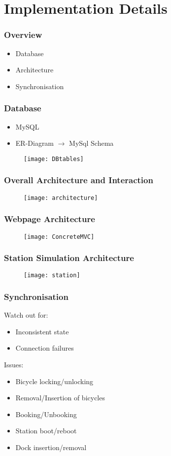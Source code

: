 \section{Implementation Details}

\begin{frame}
\frametitle{Overview}
\begin{itemize}
\item Database
\item Architecture
\item Synchronisation
\end{itemize}
\end{frame}

\begin{frame}
\frametitle{Database}
\begin{itemize}
	\item MySQL
	\item ER-Diagram $\rightarrow$ MySql Schema
\end{itemize}
	\begin{figure}
		\texttt{[image: DBtables]}
	\end{figure}
\end{frame}


\begin{frame}
	\frametitle{Overall Architecture and Interaction}
		\begin{figure}
		\centering
			\texttt{[image: architecture]}
		\end{figure}
\end{frame}

\begin{frame}
	\frametitle{Webpage Architecture}
	\begin{figure}
	\centering
		\texttt{[image: ConcreteMVC]}
	\end{figure}
\end{frame}

\begin{frame}
	\frametitle{Station Simulation Architecture}
		\begin{figure}
		\centering
			\texttt{[image: station]}
		\end{figure}
\end{frame}

\begin{frame}
	\frametitle{Synchronisation}
	Watch out for:
	\begin{itemize}
		\item Inconsistent state
		\item Connection failures
	\end{itemize}
	\pause
	Issues:
	\begin{itemize}
		\item Bicycle locking/unlocking
		\item Removal/Insertion of bicycles
		\item Booking/Unbooking
		\item Station boot/reboot
		\item Dock insertion/removal
	\end{itemize}
\end{frame}